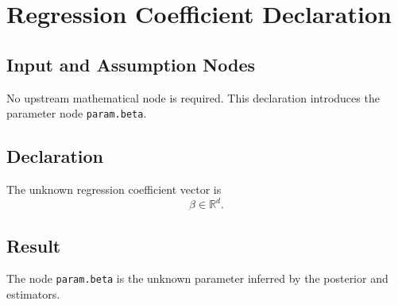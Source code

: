 \section{Regression Coefficient Declaration}
\label{def:beta}

\subsection{Input and Assumption Nodes}
No upstream mathematical node is required. This declaration introduces the parameter node \texttt{param.beta}.

\subsection{Declaration}
The unknown regression coefficient vector is
\[
  \beta \in \mathbb{R}^{d}.
\]

\subsection{Result}
The node \texttt{param.beta} is the unknown parameter inferred by the posterior and estimators.

